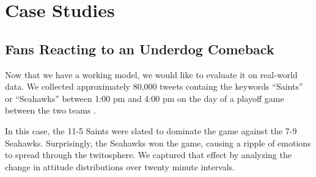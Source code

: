 \documentclass[fontsize=10pt,twocolumn,letterpaper,abstracton]{scrartcl}
\begin{document}
\section{Case Studies}

\subsection{Fans Reacting to an Underdog Comeback}

Now that we have a working model, we would like to evaluate it on real-world data. We collected approximately 80,000 tweets containg the keywords ``Saints'' or ``Seahawks'' between 1:00 pm and 4:00 pm on the day of a playoff game between the two teams . 

In this case, the 11-5 Saints were slated to dominate the game against the 7-9 Seahawks.  Surprisingly, the Seahawks won the game, causing a ripple of emotions to spread through the twitosphere. We captured that effect by analyzing the change in attitude distributions over twenty minute intervals.


\def\gametime{{"1:00", "1:20", "1:40", "2:00", "2:20", "2:40", "3:00", "3:20", "3:40"}}
\begin{figure}[H]
\end{figure}
\end{document}
